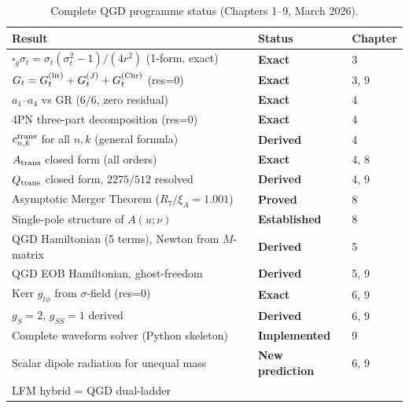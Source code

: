 \documentclass[11pt,a4paper]{article}
\theoremstyle{plain}
\theoremstyle{definition}
\theoremstyle{remark}
\newcommand{\xiA}{\xi_A}
\begin{document}
\begin{table}[h]
\centering\small\renewcommand{\arraystretch}{1.3}
\caption{Complete QGD programme status (Chapters 1--9, March 2026).}
\label{tab:status}
\begin{tabular}{@{}p{6.8cm}p{3cm}p{2.8cm}@{}}
\toprule
Result & Status & Chapter \\
\midrule
\rowcolor{lightgray}
$\square_g\sigma_t = \sigma_t(\sigma_t^2-1)/(4r^2)$ (1-form, exact) &
  \textcolor{confirmed}{\textbf{Exact}} & 3 \\
$G_t = G_t^{(\rm lit)} + G_t^{(J)} + G_t^{(\rm Chr)}$ (res=0) &
  \textcolor{confirmed}{\textbf{Exact}} & 3, 9 \\
\rowcolor{lightgray}
$a_1$--$a_4$ vs GR (6/6, zero residual) &
  \textcolor{confirmed}{\textbf{Exact}} & 4 \\
4PN three-part decomposition (res=0) &
  \textcolor{confirmed}{\textbf{Exact}} & 4 \\
\rowcolor{lightgray}
$c_{n,k}^{\rm trans}$ for all $n,k$ (general formula) &
  \textcolor{confirmed}{\textbf{Derived}} & 4 \\
$A_{\rm trans}$ closed form (all orders) &
  \textcolor{confirmed}{\textbf{Exact}} & 4, 8 \\
\rowcolor{lightgray}
$Q_{\rm trans}$ closed form, $2275/512$ resolved &
  \textcolor{confirmed}{\textbf{Derived}} & 4, 9 \\
Asymptotic Merger Theorem ($R_7/\xiA=1.001$) &
  \textcolor{confirmed}{\textbf{Proved}} & 8 \\
\rowcolor{lightgray}
Single-pole structure of $A(u;\nu)$ &
  \textcolor{confirmed}{\textbf{Established}} & 8 \\
QGD Hamiltonian (5 terms), Newton from $M$-matrix &
  \textcolor{confirmed}{\textbf{Derived}} & 5 \\
\rowcolor{lightgray}
QGD EOB Hamiltonian, ghost-freedom &
  \textcolor{confirmed}{\textbf{Derived}} & 5, 9 \\
Kerr $g_{t\phi}$ from $\sigma$-field (res=0) &
  \textcolor{confirmed}{\textbf{Exact}} & 6, 9 \\
\rowcolor{lightgray}
$g_S=2$, $g_{SS}=1$ derived &
  \textcolor{confirmed}{\textbf{Derived}} & 6, 9 \\
Complete waveform solver (Python skeleton) &
  \textcolor{confirmed}{\textbf{Implemented}} & 9 \\
\rowcolor{lightgray}
Scalar dipole radiation for unequal mass &
  \textcolor{predicted}{\textbf{New prediction}} & 6, 9 \\
LFM hybrid = QGD dual-ladder &

\end{tabular}
\end{table}
\end{document}
